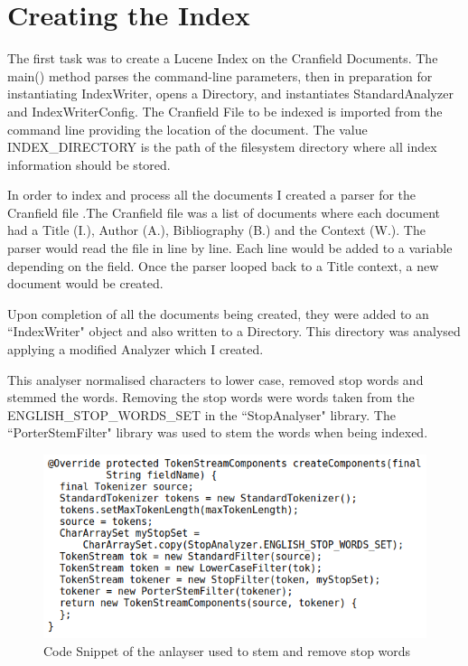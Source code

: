 \section{Creating the Index}

The first task was to create a Lucene Index on the Cranfield Documents. The main() method parses the command-line parameters, then in preparation for instantiating IndexWriter, opens a Directory, and instantiates StandardAnalyzer and IndexWriterConfig. The Cranfield File to be indexed is imported from the command line providing the location of the document. The value INDEX\_DIRECTORY is the path of the filesystem directory where all index information should be stored.  \par 

In order to index and process all the documents I created a parser for the Cranfield file .The Cranfield file was a list of documents where each document had a Title (I.), Author (A.), Bibliography (B.) and the Context (W.). The parser would read the file in line by line. Each line would be added to a variable depending on the field. Once the parser looped back to a Title context, a new document would be created. \par 
	
Upon completion of all the documents being created, they were added to an ``IndexWriter" object and also written to a Directory. This directory was analysed applying a modified Analyzer which I created. \par

This analyser normalised characters to lower case, removed stop words and stemmed the words. Removing the stop words were words taken from the ENGLISH\_STOP\_WORDS\_SET in the ``StopAnalyser" library. The ``PorterStemFilter" library was used to stem the words when being indexed.  \par

	\begin{figure}[ht!]
		\begin{center}
			\includegraphics[scale=.4 ]{2} 
			\caption{Code Snippet of the anlayser used to stem and remove stop words}
			\label{fig:1}
		\end{center}
	\end{figure} \par

